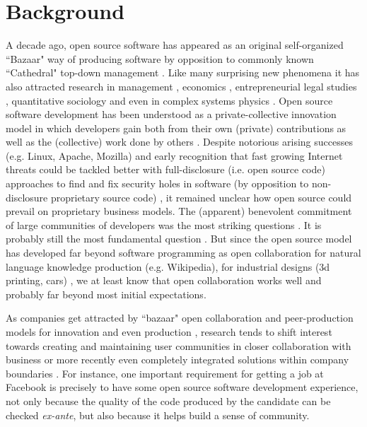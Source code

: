 \section{Background}
A decade ago, open source software has appeared as an original self-organized ``Bazaar" way of producing software by opposition to commonly known ``Cathedral" top-down management \cite{raymond1999}. Like many surprising new phenomena it has also attracted research in management \cite{vonkrogh2006pro}, economics \cite{lerner2002}, entrepreneurial legal studies \cite{benkler2002},  quantitative sociology \cite{} and even in complex systems physics \cite{}. Open source software development has been understood as a private-collective 
innovation model in which developers gain both from their own (private) contributions as well as the (collective) work done by others \cite{vonhippel2003oss}. Despite notorious arising successes (e.g. Linux, Apache, Mozilla) and early recognition that fast growing Internet threats could be tackled better with full-disclosure (i.e. open source code) approaches to find and fix security holes in software (by opposition to non-disclosure  proprietary source code) \cite{}, it remained unclear how open source could prevail on proprietary business models.  The (apparent) benevolent commitment of large communities of developers was the most striking questions \cite{}. It is probably still the most fundamental question \cite{benkler2011leviathan}. But since the open source model has developed far beyond software programming as open collaboration for natural language knowledge production (e.g. Wikipedia), for industrial designs (3d printing, cars) \cite{raasch2009,pearce2012}, we at least know that open collaboration works well and probably far beyond most initial expectations. 

As companies get attracted by  ``bazaar" open collaboration and peer-production models for innovation \cite{} and even production \cite{hamel2011first}, research tends to shift interest towards creating and maintaining user communities \cite{vonHippel2001} in closer collaboration with business  \cite{bonaccorsi2004ais} or more recently even completely integrated solutions within company boundaries \cite{}. For instance, one important requirement for getting a job at Facebook is precisely to have some open source software development experience, not only because the quality  of the code produced by the candidate can be checked {\it ex-ante}, but also because it helps build a sense of community.



